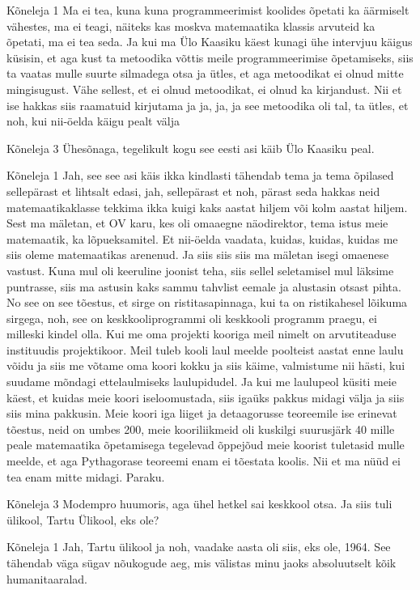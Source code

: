 Kõneleja 1
Ma ei tea, kuna kuna programmeerimist koolides õpetati ka äärmiselt vähestes, ma ei teagi, näiteks kas moskva matemaatika klassis arvuteid ka õpetati, ma ei tea seda. Ja kui ma Ülo Kaasiku käest kunagi ühe intervjuu käigus küsisin, et aga kust ta metoodika võttis meile programmeerimise õpetamiseks, siis ta vaatas mulle suurte silmadega otsa ja ütles, et aga metoodikat ei olnud mitte mingisugust. Vähe sellest, et ei olnud metoodikat, ei olnud ka kirjandust. Nii et ise hakkas siis raamatuid kirjutama ja ja, ja, ja see metoodika oli tal, ta ütles, et noh, kui nii-öelda käigu pealt välja 

Kõneleja 3
Ühesõnaga, tegelikult kogu see eesti asi käib Ülo Kaasiku peal. 

Kõneleja 1
Jah, see see asi käis ikka kindlasti tähendab tema ja tema õpilased sellepärast et lihtsalt edasi, jah, sellepärast et noh, pärast seda hakkas neid matemaatikaklasse tekkima ikka kuigi kaks aastat hiljem või kolm aastat hiljem. Sest ma mäletan, et OV karu, kes oli omaaegne näodirektor, tema istus meie matemaatik, ka lõpueksamitel. Et nii-öelda vaadata, kuidas, kuidas, kuidas me siis oleme matemaatikas arenenud. Ja siis siis siis ma mäletan isegi omaenese vastust. Kuna mul oli keeruline joonist teha, siis sellel seletamisel mul läksime puntrasse, siis ma astusin kaks sammu tahvlist eemale ja alustasin otsast pihta. No see on see tõestus, et sirge on ristitasapinnaga, kui ta on ristikahesel lõikuma sirgega, noh, see on keskkooliprogrammi oli keskkooli programm praegu, ei milleski kindel olla. Kui me oma projekti kooriga meil nimelt on arvutiteaduse instituudis projektikoor. Meil tuleb kooli laul meelde poolteist aastat enne laulu võidu ja siis me võtame oma koori kokku ja siis käime, valmistume nii hästi, kui suudame mõndagi ettelaulmiseks laulupidudel. Ja kui me laulupeol küsiti meie käest, et kuidas meie koori iseloomustada, siis igaüks pakkus midagi välja ja siis siis mina pakkusin. Meie koori iga liiget ja detaagorusse teoreemile ise erinevat tõestus, neid on umbes 200, meie kooriliikmeid oli kuskilgi suurusjärk 40 mille peale matemaatika õpetamisega tegelevad õppejõud meie koorist tuletasid mulle meelde, et aga Pythagorase teoreemi enam ei tõestata koolis. Nii et ma nüüd ei tea enam mitte midagi. Paraku. 

Kõneleja 3
Modempro huumoris, aga ühel hetkel sai keskkool otsa. Ja siis tuli ülikool, Tartu Ülikool, eks ole? 

Kõneleja 1
Jah, Tartu ülikool ja noh, vaadake aasta oli siis, eks ole, 1964. See tähendab väga sügav nõukogude aeg, mis välistas minu jaoks absoluutselt kõik humanitaaralad. 

